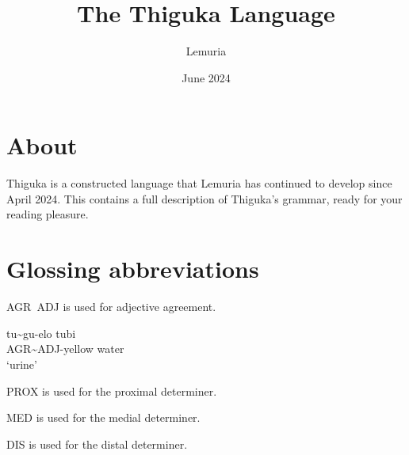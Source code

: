 \documentclass{thiguka}
\title{The Thiguka Language}
\date{June 2024}
\author{Lemuria}
\begin{document}
\maketitle

\newpage

\thigukacopyright{}

\section*{About}
Thiguka is a constructed language that Lemuria has continued to develop since April 2024.
This contains a full description of Thiguka's grammar, ready for your reading pleasure.

\section*{Glossing abbreviations}

AGR~ADJ is used for adjective agreement.
\begin{exe}
    \ex{} \gll{}tu\~{}{}gu-elo tubi\\
    AGR\~{}ADJ-yellow water\\
    \glt{}`urine'
\end{exe}

PROX is used for the proximal determiner.

MED is used for the medial determiner.

DIS is used for the distal determiner.

\newpage

\tableofcontents







\end{document}
